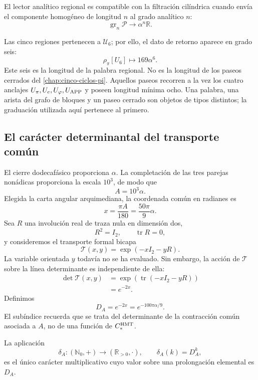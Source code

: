 \begin{definition}
\label{p12-83-c13-s3:def:compatibilidad-grado}
El lector analítico regional es compatible con la filtración cilíndrica
cuando envía el componente homogéneo de longitud \(n\) al grado analítico
\(n\):
\[
\operatorname{gr}_n\mathcal P\longrightarrow
\alpha^n\mathbb R.
\]
\end{definition}

Las cinco regiones pertenecen a \(\mathcal U_6\); por ello, el dato de
retorno aparece en grado seis:
\[
\rho_\pi[U_6]\longmapsto169\alpha^6.
\]
Este seis es la longitud de la palabra regional. No es la longitud de los
paseos cerrados del \cref{chap:cinco-ciclos-pi}. Aquellos paseos recorren a
la vez los cuatro anclajes
\(U_\pi,U_e,U_\varphi,U_{\rm APP}\) y poseen longitud mínima ocho. Una
palabra, una arista del grafo de bloques y un paseo cerrado son objetos de
tipos distintos; la graduación utilizada aquí pertenece al primero.

\subsection{El carácter determinantal del transporte común}

El cierre dodecafásico proporciona \(\alpha\). La completación de las tres
parejas nonádicas proporciona la escala \(10^3\), de modo que
\[
A=10^3\alpha.
\]
Elegida la carta angular arquimediana, la coordenada común en radianes es
\[
x=\frac{\pi A}{180}=\frac{50\pi}{9}\alpha.
\]
Sea \(R\) una involución real de traza nula en dimensión dos,
\[
R^2=I_2,
\qquad
\operatorname{tr}R=0,
\]
y consideremos el transporte formal bicapa
\[
\mathcal T(x,y)=\exp(-xI_2-yR).
\]
La variable orientada \(y\) todavía no se ha evaluado. Sin embargo, la acción
de \(\mathcal T\) sobre la línea determinante es independiente de ella:
\[
\begin{aligned}
\det\mathcal T(x,y)
&=\exp\!\left(\operatorname{tr}(-xI_2-yR)\right)\\
&=e^{-2x}.
\end{aligned}
\]
Definimos
\[
\boxed{
D_A=e^{-2x}=e^{-100\pi\alpha/9}.}
\]
El subíndice recuerda que se trata del determinante de la contracción común
asociada a \(A\), no de una función de \(C_*^{\rm HMT}\).

\begin{proposition}
\label{p12-83-c13-s3:prop:caracter-determinante}
La aplicación
\[
\delta_A:(\mathbb N_0,+)\longrightarrow(\mathbb R_{>0},\cdot),
\qquad
\delta_A(k)=D_A^k,
\]
es el único carácter multiplicativo cuyo valor sobre una prolongación
elemental es \(D_A\).
\end{proposition}

